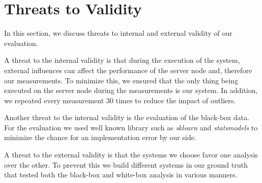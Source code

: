 \section{Threats to Validity}\label{sec:threats}

In this section, we discuss threats to internal and external validity of our evaluation.

A threat to the internal validity is that during the execution of the system, 
external influences can affect the performance of the server node and, therefore our measurements. 
To minimize this, we ensured that the only thing being executed on the server node during the measurements is our system. 
In addition, we repeated every measurement $30$ times to reduce the impact of outliers.  

Another threat to the internal validity is the evaluation of the black-box data. 
For the evaluation we used well known library such as \emph{sklearn} and \emph{statsmodels} 
to minimize the chance for an implementation error by our side.

A threat to the external validity is that the systems we choose favor one analysis over the other. 
To prevent this we build different systems in our ground truth that tested both the black-box and white-box analysis 
in various manners.
